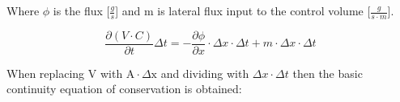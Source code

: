 








Where $\phi$ is the flux [$\frac{g}{s}$] and m is lateral flux input to the control volume [$\frac{g}{s\cdot m}$].


\begin{equation}
	\frac{\partial (V\cdot C)}{\partial t}\Delta t = - \frac{\partial \phi}{\partial x}\cdot \Delta x \cdot \Delta t +m \cdot \Delta x \cdot \Delta t
\end{equation}

When replacing V with $\text{A}\cdot \Delta \text{x}$ and dividing with $\Delta x \cdot  \Delta t$ then the basic continuity equation of conservation is obtained:

